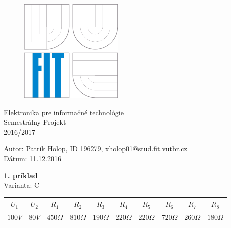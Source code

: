 \documentclass[a4paper,12pt]{article}
\author{Patrik Holop - xholop01}
\begin{document}
\begin{figure}[!h]
  \centering
  \includegraphics[height=5cm]{obrazky/fit}
\end{figure}

\begin{center}
\bigskip
\begin{Huge}
Elektronika pre informačné technológie\\
\bigskip
Semestrálny Projekt\\
2016/2017\\
\end{Huge}
\end{center}

\vfill

\begin{flushleft}
 \begin{large}
 Autor: Patrik Holop, ID 196279, xholop01@stud.fit.vutbr.cz\\
 Dátum: 11.12.2016
 \end{large}
\end{flushleft}

\newpage
\begin{flushleft}
\textbf{1. príklad}\\
Varianta: C
\end{flushleft}

\begin{tabular}{|c|c|c|c|c|c|c|c|c|c|}
\hline $U_1$ & $U_2$ & $R_1$ & $R_2$ & $R_3$ & $R_4$ & $R_5$ & $R_6$ & $R_7$ & $R_8$ \\ 
\hline
$100V$ & $80V$ &  $450\Omega$ & $810\Omega$ & $190\Omega$ & $220\Omega$ & $220\Omega$ & $720\Omega$ & $260\Omega$ & $180\Omega$ \\ 
\hline
\end{tabular}
\bigskip
\end{document}
